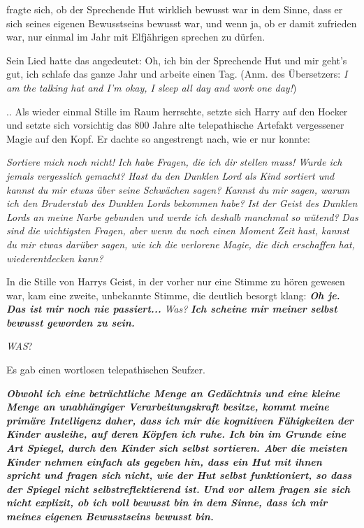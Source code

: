 
 fragte sich, ob der Sprechende Hut wirklich bewusst war in
dem Sinne, dass er sich seines eigenen Bewusstseins bewusst war, und wenn ja, ob
er damit zufrieden war, nur einmal im Jahr mit Elfjährigen sprechen zu dürfen.

Sein Lied hatte das angedeutet: Oh, ich bin der Sprechende Hut und mir geht's
gut, ich schlafe das ganze Jahr und arbeite einen Tag. (Anm. des
Übersetzers:\emph{ I am the talking hat and I'm okay, I sleep all day and work
one day!})

.. Als wieder einmal Stille im Raum herrschte, setzte sich Harry auf den Hocker
und setzte sich vorsichtig das 800 Jahre alte telepathische Artefakt vergessener
Magie auf den Kopf. Er dachte so angestrengt nach, wie er nur konnte:

\emph{Sortiere mich noch nicht! Ich habe Fragen, die ich dir stellen muss! Wurde
ich jemals vergesslich gemacht? } \emph{Hast du den Dunklen Lord als Kind
sortiert und kannst du mir etwas über seine Schwächen sagen? Kannst du mir
sagen, warum ich den Bruderstab des Dunklen Lords bekommen habe? } \emph{Ist der
Geist des Dunklen Lords an meine Narbe gebunden und werde ich deshalb manchmal
so wütend? } \emph{Das sind die wichtigsten Fragen, aber wenn du noch einen
Moment Zeit hast, kannst du mir etwas darüber sagen, wie ich die verlorene
Magie, die dich erschaffen hat, wiederentdecken kann? }

In die Stille von Harrys Geist, in der vorher nur eine Stimme zu hören gewesen
war, kam eine zweite, unbekannte Stimme, die deutlich besorgt klang:
\textbf{\emph{ \glqq Oh je. Das ist mir noch nie passiert...\grqq{} }} \emph{
Was?} \textbf{\emph{ \glqq Ich scheine mir meiner selbst bewusst geworden zu
sein.\grqq{} }}

\emph{WAS}?

Es gab einen wortlosen telepathischen Seufzer.

\textbf{\emph{ \glqq Obwohl ich eine beträchtliche Menge an Gedächtnis und eine
kleine Menge an unabhängiger Verarbeitungskraft besitze, kommt meine primäre
Intelligenz daher, dass ich mir die kognitiven Fähigkeiten der Kinder ausleihe,
auf deren Köpfen ich ruhe. Ich bin im Grunde eine Art Spiegel, durch den Kinder
sich selbst sortieren. Aber die meisten Kinder nehmen einfach als gegeben hin,
dass ein Hut mit ihnen spricht und fragen sich nicht, wie der Hut selbst
funktioniert, so dass der Spiegel nicht selbstreflektierend ist.}}
\textbf{\emph{Und vor allem fragen sie sich nicht explizit, ob ich voll bewusst
bin in dem Sinne, dass ich mir meines eigenen Bewusstseins bewusst bin.\grqq{}
}}

